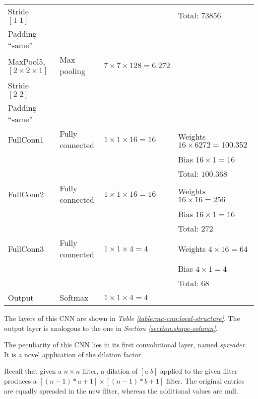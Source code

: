 \begin{table*}
\begin{tabular}{|l|l|l|l|}
                    Stride $\left[1\;1\right]$ & & & Total: $73856$\\
                    Padding ``same'' & & & \\\hline
                    MaxPool5, $\left[2\times 2\times 1\right]$ & Max pooling & $7\times 7\times 128 = 6.272$ & \\
                    Stride $\left[2\;2\right]$ & & & \\
                    Padding ``same'' & & & \\\hline
                    FullConn1 & Fully connected & $1\times 1\times 16 = 16$ & Weights $16\times 6272 = 100.352$\\
                    & & & Bias $16\times 1 = 16$\\
                    & & & Total: $100.368$\\\hline
                    FullConn2 & Fully connected & $1\times 1\times 16 = 16$ & Weights $16\times 16 = 256$\\
                    & & & Bias $16\times 1 = 16$\\
                    & & & Total: $272$\\\hline
                    FullConn3 & Fully connected & $1\times 1\times 4 = 4$ & Weights $4\times 16 = 64$\\
                    & & & Bias $4\times 1 = 4$\\
                    & & & Total: $68$\\\hline
                    Output & Softmax & $1\times 1\times 4 = 4$ & \\
                \hline
            \end{tabular}
            \vspace{0.5cm}
            \caption{Local column CNN layers.}\label{table:mc-cnn:local-structure}
        \end{table*}
        \par{
            The layers of this CNN are shown in \emph{Table \ref{table:mc-cnn:local-structure}}. The output layer is analogous to the one in \emph{Section \ref{section:shape-column}}.
        }
        \par{
            The peculiarity of this CNN lies in its first convolutional layer, named \emph{spreader}. It is a novel application of the dilation factor. 
        }
        \par{
            Recall that given a $n\times n$ filter, a dilation of $[a\;b]$ applied to the given filter produces a $\left[\left(n-1\right)*a + 1\right] \times \left[\left(n-1\right)*b + 1\right]$ filter. The original entries are equally spreaded in the new filter, whereas the additional values are null.
        }
